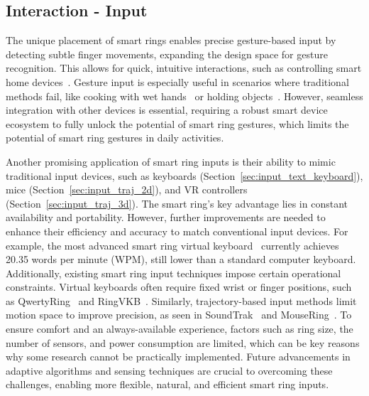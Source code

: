 \subsection{Interaction - Input}
The unique placement of smart rings enables precise gesture-based input by detecting subtle finger movements, expanding the design space for gesture recognition. This allows for quick, intuitive interactions, such as controlling smart home devices~\cite{liu2023understanding}. Gesture input is especially useful in scenarios where traditional methods fail, like cooking with wet hands~\cite{han2016exploring} or holding objects~\cite{wolf2016microgesture}. However, seamless integration with other devices is essential, requiring a robust smart device ecosystem to fully unlock the potential of smart ring gestures, which limits the potential of smart ring gestures in daily activities.

Another promising application of smart ring inputs is their ability to mimic traditional input devices, such as keyboards (Section~\ref{sec:input_text_keyboard}), mice (Section~\ref{sec:input_traj_2d}), and VR controllers (Section~\ref{sec:input_traj_3d}). The smart ring's key advantage lies in constant availability and portability. However, further improvements are needed to enhance their efficiency and accuracy to match conventional input devices. For example, the most advanced smart ring virtual keyboard~\cite{gu2020qwertyring} currently achieves 20.35 words per minute (WPM), still lower than a standard computer keyboard. Additionally, existing smart ring input techniques impose certain operational constraints. Virtual keyboards often require fixed wrist or finger positions, such as QwertyRing~\cite{gu2020qwertyring} and RingVKB~\cite{li2023ringvkb}. Similarly, trajectory-based input methods limit motion space to improve precision, as seen in SoundTrak~\cite{zhang2017soundtrak} and MouseRing~\cite{shen2024mousering}. To ensure comfort and an always-available experience, factors such as ring size, the number of sensors, and power consumption are limited, which can be key reasons why some research cannot be practically implemented. Future advancements in adaptive algorithms and sensing techniques are crucial to overcoming these challenges, enabling more flexible, natural, and efficient smart ring inputs.

